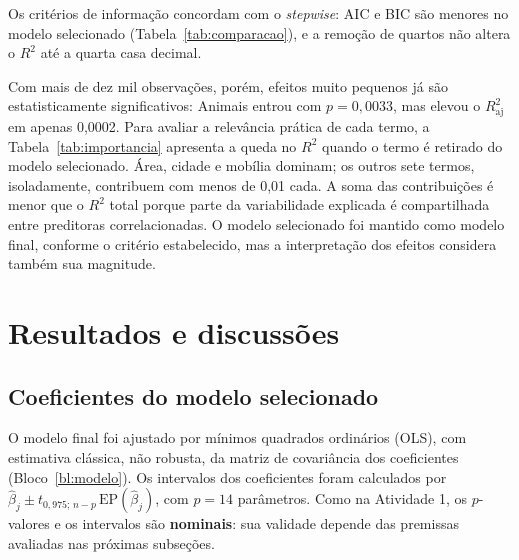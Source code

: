 \documentclass[12pt,a4paper]{article}
\newcommand{\Rtwo}{\ensuremath{R^2}}
\newcommand{\Rtwoadj}{\ensuremath{R^2_{\text{aj}}}}
\begin{document}
\begin{table}[H]
\centering
\caption{Comparação entre o modelo com todas as candidatas e o modelo selecionado.}
\label{tab:comparacao}
\footnotesize

\end{table}

Os critérios de informação concordam com o \textit{stepwise}: AIC e BIC são menores no modelo selecionado (Tabela~\ref{tab:comparacao}), e a remoção de quartos não altera o \Rtwo{} até a quarta casa decimal.

Com mais de dez mil observações, porém, efeitos muito pequenos já são estatisticamente significativos: Animais entrou com $p=0{,}0033$, mas elevou o \Rtwoadj{} em apenas 0,0002. Para avaliar a relevância prática de cada termo, a Tabela~\ref{tab:importancia} apresenta a queda no \Rtwo{} quando o termo é retirado do modelo selecionado. Área, cidade e mobília dominam; os outros sete termos, isoladamente, contribuem com menos de 0,01 cada. A soma das contribuições é menor que o \Rtwo{} total porque parte da variabilidade explicada é compartilhada entre preditoras correlacionadas. O modelo selecionado foi mantido como modelo final, conforme o critério estabelecido, mas a interpretação dos efeitos considera também sua magnitude.

\begin{table}[H]
\centering
\caption{Contribuição de cada termo: redução do \Rtwo{} ao retirá-lo do modelo selecionado.}
\label{tab:importancia}
\footnotesize

\end{table}
\FloatBarrier

\section{Resultados e discussões}

\subsection{Coeficientes do modelo selecionado}

O modelo final foi ajustado por mínimos quadrados ordinários (OLS), com estimativa clássica, não robusta, da matriz de covariância dos coeficientes (Bloco~\ref{bl:modelo}). Os intervalos dos coeficientes foram calculados por $\widehat{\beta}_j\pm t_{0,975;\,n-p}\,\mathrm{EP}(\widehat{\beta}_j)$, com $p=14$ parâmetros. Como na Atividade 1, os $p$-valores e os intervalos são \textbf{nominais}: sua validade depende das premissas avaliadas nas próximas subseções.
\end{document}
